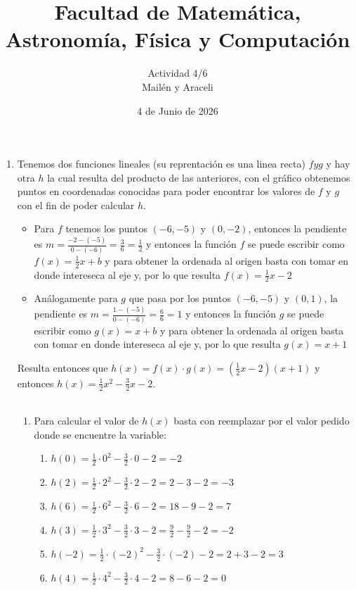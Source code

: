 \documentclass[a4paper]{article}
\title{Facultad de Matemática, Astronomía, Física y Computación}
\author{Actividad 4/6\\ Mailén y Araceli}
\date{4 de Junio de 2026}
\begin{document}
\maketitle
\begin{enumerate}
    \item Tenemos dos funciones lineales (su reprentación es una linea recta) $f y g$ y hay otra $h$ la cual resulta del producto de las anteriores, con el gráfico obtenemos puntos en coordenadas conocidas para poder encontrar los valores de $f$ y $g$ con el fin de poder calcular $h$.
    \begin{itemize}
        \item Para $f$ tenemos los puntos $(-6,-5)$ y $(0,-2)$, entonces la pendiente es $m=\frac{-2-(-5)}{0-(-6)}=\frac{3}{6}=\frac{1}{2}$ y entonces la función $f$ se puede escribir como $f(x)=\frac{1}{2}x +b$ y para obtener la ordenada al origen basta con tomar en donde intereseca al eje y, por lo que resulta $f(x)=\frac{1}{2}x -2$
        \item Análogamente para $g$ que pasa por los puntos $(-6,-5)$ y $(0,1)$, la pendiente es $m=\frac{1-(-5)}{0-(-6)}=\frac{6}{6}=1$ y entonces la función $g$ se puede escribir como $g(x)=x +b$ y para obtener la ordenada al origen basta con tomar en donde intereseca al eje y, por lo que resulta $g(x)=x +1$
    \end{itemize}
    Resulta entonces que $h(x)=f(x)\cdot g(x)=(\frac{1}{2}x -2)(x +1)$ y entonces $h(x)=\frac{1}{2}x^2 -\frac{3}{2}x -2$.\\\\
    \begin{enumerate}
        \item Para calcular el valor de $h(x)$ basta con reemplazar por el valor pedido donde se encuentre la variable:
        \begin{enumerate}
            \item $h(0)=\frac{1}{2}\cdot 0^2 -\frac{3}{2}\cdot 0 -2=-2$
            \item $h(2)=\frac{1}{2}\cdot 2^2 -\frac{3}{2}\cdot 2 -2=2-3-2=-3$
            \item $h(6)=\frac{1}{2}\cdot 6^2 -\frac{3}{2}\cdot 6 -2=18-9-2=7$
            \item $h(3)=\frac{1}{2}\cdot 3^2 -\frac{3}{2}\cdot 3 -2=\frac{9}{2}-\frac{9}{2}-2=-2$
            \item $h(-2)=\frac{1}{2}\cdot (-2)^2 -\frac{3}{2}\cdot (-2) -2=2+3-2=3$
            \item $h(4)=\frac{1}{2}\cdot 4^2 -\frac{3}{2}\cdot 4 -2=8-6-2=0$

\end{enumerate}
\end{enumerate}
\end{enumerate}
\end{document}
